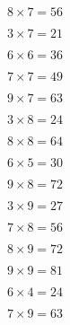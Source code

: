 \documentclass[11pt]{article}
\begin{document}
\begin{center}
\begin{multicols}{5}

\begin{equation} 8 \times 7 = 56 \end{equation}

\begin{equation} 3 \times 7 = 21 \end{equation}

\begin{equation} 6 \times 6 = 36 \end{equation}

\begin{equation} 7 \times 7 = 49 \end{equation}

\begin{equation} 9 \times 7 = 63 \end{equation}

\begin{equation} 3 \times 8 = 24 \end{equation}

\begin{equation} 8 \times 8 = 64 \end{equation}

\begin{equation} 6 \times 5 = 30 \end{equation}

\begin{equation} 9 \times 8 = 72 \end{equation}

\begin{equation} 3 \times 9 = 27 \end{equation}

\begin{equation} 7 \times 8 = 56 \end{equation}

\begin{equation} 8 \times 9 = 72 \end{equation}

\begin{equation} 9 \times 9 = 81 \end{equation}

\begin{equation} 6 \times 4 = 24 \end{equation}

\begin{equation} 7 \times 9 = 63 \end{equation}

\end{multicols}
\end{center}
\end{document}
